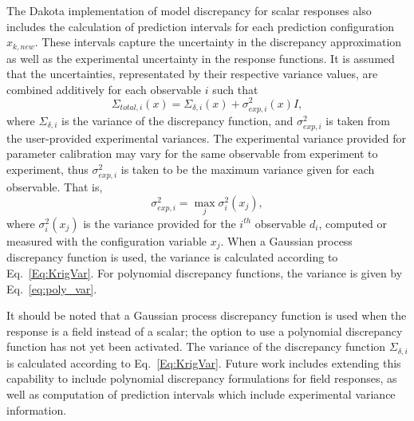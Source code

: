 The Dakota implementation of model discrepancy for scalar responses also 
includes the calculation
of prediction intervals for each prediction configuration $x_{k,new}$. These
intervals capture the uncertainty in the discrepancy approximation as well as
the experimental uncertainty in the response functions. It is assumed that the
uncertainties, representated by their respective variance values, are combined 
additively for each observable $i$ such that
\begin{equation}\label{eq:md_totalvar}
\Sigma_{total,i}(x) = \Sigma_{\delta,i}(x) + \sigma^2_{exp,i}(x)I,
\end{equation} 
where $\Sigma_{\delta,i}$ is the variance of the discrepancy function, and
$\sigma^2_{exp,i}$ is taken from the user-provided experimental variances.
The experimental variance provided for parameter calibration may vary for the
same observable from experiment to experiment, thus $\sigma^{2}_{exp,i}$ is
taken to be the maximum variance given for each observable. That is,
\begin{equation}
\sigma^2_{exp,i} = \max_{j} \sigma^2_{i}(x_j), 
\end{equation}
where $\sigma^2_{i}(x_j)$ is the variance provided for the $i^{th}$ observable
$d_i$, computed or measured with the configuration variable $x_j$. 
When a Gaussian process discrepancy function is used, the variance is calculated
according to Eq.~\ref{Eq:KrigVar}. For polynomial discrepancy functions, the
variance is given by Eq.~\ref{eq:poly_var}. 

It should be noted that a Gaussian process discrepancy function is used when 
the response is a field instead of a scalar; the option to use a polynomial
discrepancy function has not yet been activated. The variance of the
discrepancy function $\Sigma_{\delta, i}$ is calculated according to 
Eq.~\ref{Eq:KrigVar}. Future work includes extending this capability to 
include polynomial discrepancy formulations for field responses, as well as 
computation of prediction intervals which include experimental variance 
information.



